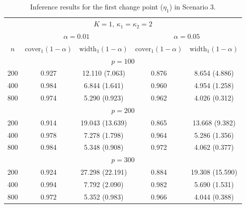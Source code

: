 \documentclass[11pt]{article}
\theoremstyle{plain}
\theoremstyle{definition}
\begin{document}
\begin{table}[htbp]
\centering
\caption{Inference results for the first change point ($\eta_1$) in Scenario 3. }
\begin{tabular}{ccccc}
\hline
\multicolumn{5}{c}{$K = 1$, $\kappa_1 = \kappa_2 = 2$} \\
 & \multicolumn{2}{c}{$\alpha = 0.01$} & \multicolumn{2}{c}{$\alpha = 0.05$} \\
$n$   & $\mathrm{cover}_1(1-\alpha)$ & $\mathrm{width}_1(1-\alpha)$ & $\mathrm{cover}_1(1-\alpha)$ & $\mathrm{width}_1(1-\alpha)$ \\ \hline
\multicolumn{5}{c}{$p = 100$}                                                                             \\
200 & 0.927            & 12.110 (7.063)  & 0.876            & 8.654 (4.886) \\
400 & 0.984            & 6.844 (1.641)  & 0.960    & 4.954 (1.258)  \\
800 & 0.974            & 5.290 (0.923)  & 0.962    & 4.026 (0.312) \\
\multicolumn{5}{c}{$p = 200$}                                                                             \\
200 & 0.914            & 19.043 (13.639) & 0.865 & 13.668 (9.382) \\
400 & 0.978            & 7.278 (1.798)  & 0.964  & 5.286 (1.356)  \\
800 & 0.984            & 5.348 (0.908)  & 0.972  & 4.062 (0.377)  \\
\multicolumn{5}{c}{$p = 300$}                                                                             \\
200 & 0.924            & 27.298 (22.191)   & 0.884    & 19.308 (15.590) \\
400 & 0.994            & 7.792 (2.090)  & 0.982    & 5.690 (1.531) \\
800 & 0.972            & 5.352 (0.983)  & 0.966   & 4.044 (0.388) \\ \hline
\end{tabular}
\label{tab:sce3_2}
\end{table}
\end{document}
